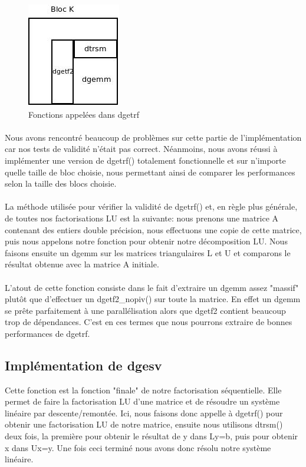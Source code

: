 \documentclass{article}
\begin{document}
\begin{figure}[!ht]
  \centering
  \includegraphics[scale=0.5]{pictures/Diagramme_dgetrf.jpeg}
  \caption{\label{diag:dgetrf} Fonctions appelées dans dgetrf}
\end{figure}

\paragraph{}Nous avons rencontré beaucoup de problèmes sur cette partie de l'implémentation car nos tests de validité n'était pas correct. Néanmoins, nous avons réussi à implémenter une version de dgetrf() totalement fonctionnelle et sur n'importe quelle taille de bloc choisie, nous permettant ainsi de comparer les performances selon la taille des blocs choisie.

\paragraph{}La méthode utilisée pour vérifier la validité de dgetrf() et, en règle plus générale, de toutes nos factorisations LU est la suivante: nous prenons une matrice A contenant des entiers double précision, nous effectuons une copie de cette matrice, puis nous appelons notre fonction pour obtenir notre décomposition LU. Nous faisons ensuite un dgemm sur les matrices triangulaires L et U et comparons le résultat obtenue avec la matrice A initiale.

\paragraph{}L'atout de cette fonction consiste dans le fait d'extraire un dgemm assez "massif" plutôt que d'effectuer un dgetf2\_nopiv() sur toute la matrice. En effet un dgemm se prête parfaitement à une parallélisation alors que dgetf2 contient beaucoup trop de dépendances. C'est en ces termes que nous pourrons extraire de bonnes performances de dgetrf.

\subsection{Implémentation de dgesv}Cette fonction est la fonction "finale" de notre factorisation séquentielle. Elle permet de faire la factorisation LU d'une matrice et de résoudre un système linéaire par descente/remontée. Ici, nous faisons donc appelle à dgetrf() pour obtenir une factorisation LU de notre matrice, ensuite nous utilisons dtrsm() deux fois, la première pour obtenir le résultat de y dans Ly=b, puis pour obtenir x dans Ux=y. Une fois ceci terminé nous avons donc résolu notre système linéaire.
\end{document}
